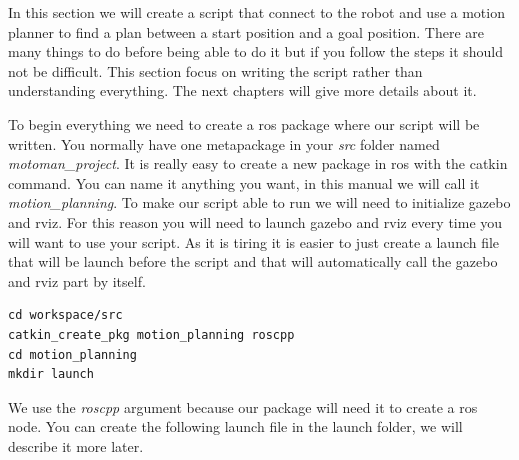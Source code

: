 In this section we will create a script that connect to the robot and use a motion planner to find a plan between a start position and a goal position. There are many things to do before being able to do it but if you follow the steps it should not be difficult. This section focus on writing the script rather than understanding everything. The next chapters will give more details about it.

To begin everything we need to create a ros package where our script will be written. You normally have one metapackage in your \emph{src} folder named \emph{motoman\_project}. It is really easy to create a new package in ros with the catkin command. You can name it anything you want, in this manual we will call it \emph{motion\_planning}. To make our script able to run we will need to initialize gazebo and rviz. For this reason you will need to launch gazebo and rviz every time you will want to use your script. As it is tiring it is easier to just create a launch file that will be launch before the script and that will automatically call the gazebo and rviz part by itself.


\begin{lstlisting}
cd workspace/src
catkin_create_pkg motion_planning roscpp
cd motion_planning
mkdir launch
\end{lstlisting}

We use the \emph{roscpp} argument because our package will need it to create a ros node. You can create the following launch file in the launch folder, we will describe it more later. 

